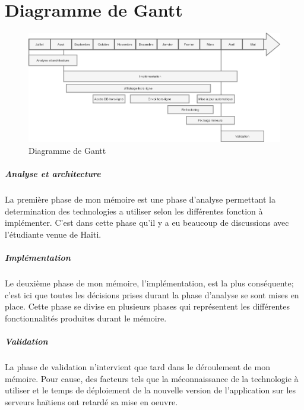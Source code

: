 \documentclass{EPL-master-thesis-covers-FR}
\begin{document}
		

	
	
	
	
	\appendix
	
		\chapter{Diagramme de Gantt}
		
			\begin{figure}[H]
					\centering
					\includegraphics[width=1\textwidth]{images/Gantt}
					\caption{Diagramme de Gantt}
					\label{fig:Gantt}
			\end{figure}
				

				
			\paragraph*{Analyse et architecture}
			La première phase de mon mémoire est une phase d'analyse permettant la determination des technologies a utiliser selon les différentes fonction à implémenter. C'est dans cette phase qu'il y a eu beaucoup de discussions avec l'étudiante venue de Haïti.
		
			\paragraph*{Implémentation} 
			Le deuxième phase de mon mémoire, l'implémentation, est la plus conséquente; c'est ici que toutes les décisions prises durant la phase d'analyse se sont mises en place. Cette phase se divise en plusieurs phases qui représentent les différentes fonctionnalités produites durant le mémoire. 
			
			\paragraph*{Validation}
			La phase de validation n'intervient que tard dans le déroulement de mon mémoire. Pour cause, des facteurs tels que la méconnaissance de la technologie à utiliser et le temps de déploiement de la nouvelle version de l'application sur les serveurs haïtiens ont retardé sa mise en oeuvre.	
		
\end{document}
